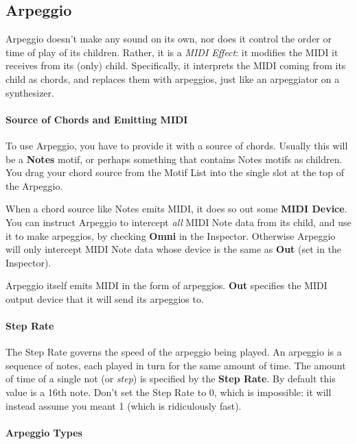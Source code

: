 \documentclass[twoside,10pt]{article}
\begin{document}
\subsection{Arpeggio}

Arpeggio doesn't make any sound on its own, nor does it control the order or time of play of its children.  Rather, it is a {\it MIDI Effect}: it modifies the MIDI it receives from its (only) child.  Specifically, it interprets the MIDI coming from its child as chords, and replaces them with arpeggios, just like an arpeggiator on a synthesizer.

\paragraph{Source of Chords and Emitting MIDI}

To use Arpeggio, you have to provide it with a source of chords.  Usually this will be a {\bf Notes} motif, or perhaps something that contains Notes motifs as children.  You drag your chord source from the Motif List into the single slot at the top of the Arpeggio.

When a chord source like Notes emits MIDI, it does so out some {\bf MIDI Device}.  You can instruct Arpeggio to intercept {\it all} MIDI Note data from its child, and use it to make arpeggios, by checking {\bf Omni} in the Inspector.  Otherwise Arpeggio will only intercept MIDI Note data whose device is the same as {\bf Out} (set in the Inspector).

Arpeggio itself emits MIDI in the form of arpeggios. {\bf Out} specifies the MIDI output device that it will send its arpeggios to.

\paragraph{Step Rate}

The Step Rate governs the speed of the arpeggio being played.  An arpeggio is a sequence of notes, each played in turn for the same amount of time.  The amount of time of a single not (or {\it step}) is specified by the {\bf Step Rate}.  By default this value is a 16th note.  Don't set the Step Rate to 0, which is impossible: it will instead assume you meant 1 (which is ridiculously fast).


\paragraph{Arpeggio Types}
\end{document}
